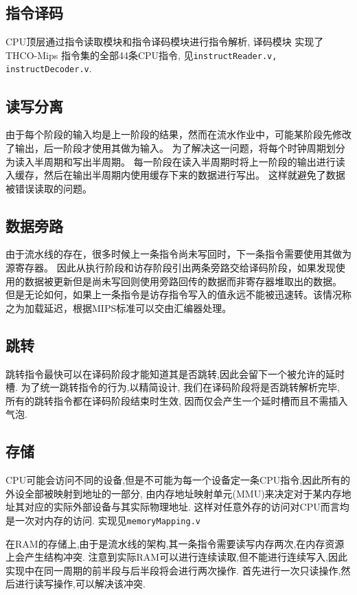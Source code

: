 \subsection{指令译码}
CPU顶层通过指令读取模块和指令译码模块进行指令解析, 译码模块
实现了THCO-Mips 指令集的全部44条CPU指令, 见\verb|instructReader.v, instructDecoder.v|.

\subsection{读写分离}
由于每个阶段的输入均是上一阶段的结果，然而在流水作业中，可能某阶段先修改了输出，后一阶段才使用其做为输入。
为了解决这一问题，将每个时钟周期划分为读入半周期和写出半周期。
每一阶段在读入半周期时将上一阶段的输出进行读入缓存，然后在输出半周期内使用缓存下来的数据进行写出。
这样就避免了数据被错误读取的问题。
\subsection{数据旁路}
由于流水线的存在，很多时候上一条指令尚未写回时，下一条指令需要使用其做为源寄存器。
因此从执行阶段和访存阶段引出两条旁路交给译码阶段，如果发现使用的数据被更新但是尚未写回则使用旁路回传的数据而非寄存器堆取出的数据。
但是无论如何，如果上一条指令是访存指令写入的值永远不能被迅速转。该情况称之为加载延迟，根据MIPS标准可以交由汇编器处理。
\subsection{跳转}
跳转指令最快可以在译码阶段才能知道其是否跳转,因此会留下一个被允许的延时槽.
为了统一跳转指令的行为,以精简设计, 我们在译码阶段将是否跳转解析完毕, 所有的跳转指令都在译码阶段结束时生效,
因而仅会产生一个延时槽而且不需插入气泡.
\subsection{存储}
CPU可能会访问不同的设备,但是不可能为每一个设备定一条CPU指令,因此所有的外设全部被映射到地址的一部分,
由内存地址映射单元(MMU)来决定对于某内存地址其对应的实际外部设备与其实际物理地址.
这样对任意外存的访问对CPU而言均是一次对内存的访问. 实现见\verb|memoryMapping.v|

在RAM的存储上,由于是流水线的架构,其一条指令需要读写内存两次,在内存资源上会产生结构冲突.
注意到实际RAM可以进行连续读取,但不能进行连续写入,因此实现中在同一周期的前半段与后半段将会进行两次操作.
首先进行一次只读操作,然后进行读写操作,可以解决该冲突.
